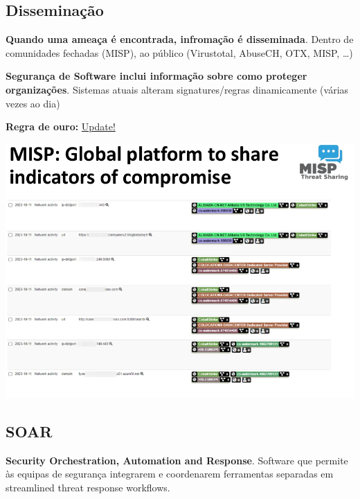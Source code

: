\documentclass{article}
\begin{document}
\pagebreak

\subsection{Disseminação}

\begin{flushleft}
  \textbf{Quando uma ameaça é encontrada, infromação é disseminada}.
  Dentro de comunidades fechadas (MISP), ao público (Virustotal,
  AbuseCH, OTX, MISP, \dots)

  \vspace{2mm}

  \begin{flushleft}
    \textbf{Segurança de Software inclui informação sobre como proteger organizações}.
    Sistemas atuais alteram signatures/regras dinamicamente (várias vezes ao dia)

    \vspace{2mm}

    \textbf{Regra de ouro:} \uline{Update!}
  \end{flushleft}
\end{flushleft}

\begin{center}
  \includegraphics[scale=0.35]{49}
\end{center}

\subsection{SOAR}

\begin{flushleft}
  \textbf{Security Orchestration, Automation and Response}. Software que
  permite às equipas de segurança integrarem e coordenarem ferramentas separadas
  em streamlined threat response workflows.
\end{flushleft}
\end{document}

